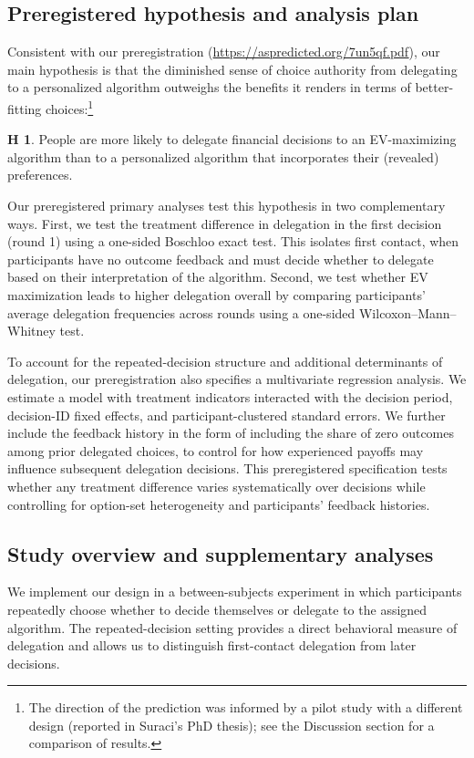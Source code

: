 \documentclass[a4paper, 12pt, fleqn]{article}
\theoremstyle{definition}
\newtheorem{hyp}{H}
\begin{document}
\subsection*{Preregistered hypothesis and analysis plan}
Consistent with our preregistration ({\scriptsize\url{https://aspredicted.org/7un5qf.pdf}}), our main hypothesis is that the diminished sense of choice authority from delegating to a personalized algorithm outweighs the benefits it renders in terms of better-fitting choices:\footnote{The direction of the prediction was informed by a pilot study with a different design (reported in Suraci's PhD thesis); see the Discussion section for a comparison of results.}
\begin{hyp}
	People are more likely to delegate financial decisions to an EV-maximizing algorithm than to a personalized algorithm that incorporates their (revealed) preferences.
\end{hyp}

Our preregistered primary analyses test this hypothesis in two complementary ways. First, we test the treatment difference in delegation in the first decision (round 1) using a one-sided Boschloo exact test. This isolates first contact, when participants have no outcome feedback and must decide whether to delegate based on their interpretation of the algorithm. Second, we test whether EV maximization leads to higher delegation overall by comparing participants' average delegation frequencies across rounds using a one-sided Wilcoxon--Mann--Whitney test.

To account for the repeated-decision structure and additional determinants of delegation, our preregistration also specifies a multivariate regression analysis. We estimate a model with treatment indicators interacted with the decision period, decision-ID fixed effects, and participant-clustered standard errors. We further include the feedback history in the form of including the share of zero outcomes among prior delegated choices, to control for how experienced payoffs may influence subsequent delegation decisions. This preregistered specification tests whether any treatment difference varies systematically over decisions while controlling for option-set heterogeneity and participants' feedback histories.

\subsection*{Study overview and supplementary analyses}
We implement our design in a between-subjects experiment in which participants repeatedly choose whether to decide themselves or delegate to the assigned algorithm. The repeated-decision setting provides a direct behavioral measure of delegation and allows us to distinguish first-contact delegation from later decisions.
\end{document}
